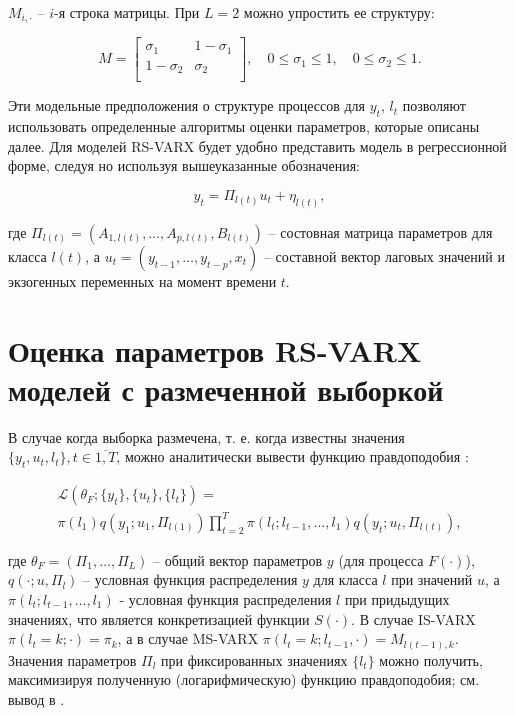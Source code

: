 \documentclass[a4paper,14pt]{extreport}
\begin{document}
\noindent
$M_{i, \cdot}$ -- $i$-я строка матрицы. При $L=2$ можно упростить ее структуру:

\begin{equation}
	M=
	\left[ {
				\begin{array}{cc}
					\sigma_{1}   & 1-\sigma_{1} \\
					1-\sigma_{2} & \sigma_{2}   \\
				\end{array}
			} \right]
	, \quad 
	0 \le \sigma_{1} \le 1
	, \quad 
	0 \le \sigma_{2} \le 1
	.
\end{equation}

Эти модельные предположения о структуре процессов для $y_t$, $l_t$ позволяют использовать определенные алгоритмы оценки параметров, которые описаны далее. Для моделей RS-VARX будет удобно представить модель в регрессионной форме, следуя \cite{malNovopMSVARX} но используя вышеуказанные обозначения:

\begin{equation}
	y_t = \Pi_{l(t)} u_t + \eta_{l(t)} ,
	\label{eq:rs_varx_as_regression}
\end{equation}

\noindent
где $ \Pi_{l(t)} = (A_{1, l(t)}, \dots, A_{p, l(t)}, B_{l(t)}) $ -- состовная матрица параметров для класса $l(t)$, 
а $ u_t = (y_{t-1}, \dots, y_{t-p}, x_{t}) $ -- составной вектор лаговых значений и экзогенных переменных на момент времени $t$.

\section{Оценка параметров RS-VARX моделей с размеченной выборкой}

В случае когда выборка размечена, т. е. когда известны значения $\{y_t, u_t, l_t\}, t \in \overline{1,T}$, можно аналитически вывести функцию правдоподобия \cite{malNovopMSVARX}:

\begin{equation}
	\begin{multlined}
		\mathcal{L}(\theta_F; \{y_t\}, \{u_t\}, \{l_t\}) ={} \\
		\pi(l_1) q(y_1; u_1, \Pi_{l(1)}) 
		\prod\limits_{t=2}^{T}{ 
		\pi(l_t; l_{t-1}, \dots, l_1) q(y_t; u_t, \Pi_{l(t)}) 
		} ,
	\end{multlined}
	\label{eq:rs_varx_loglike}
\end{equation}

\noindent
где $\theta_F = (\Pi_1, \dots, \Pi_L)$ -- общий вектор параметров $y$ (для процесса $F(\cdot)$), $q(\cdot; u, \Pi_l)$ -- условная функция распределения $y$ для класса $l$ при значений $u$, а $\pi(l_t; l_{t-1}, \dots, l_1)$ - условная функция распределения $l$ при придыдущих значениях, что является конкретизацией функции $S(\cdot)$. В случае IS-VARX $\pi(l_t = k; \cdot) = \pi_k$, а в случае MS-VARX $\pi(l_t = k; l_{t-1}, \cdot) = M_{l(t-1), k}$.
Значения параметров $\Pi_l$ при фиксированных значениях $\{l_t\}$ можно получить, максимизируя полученную (логарифмическую) функцию правдоподобия; см. вывод в \cite{malNovopMSVARX}.
\end{document}
